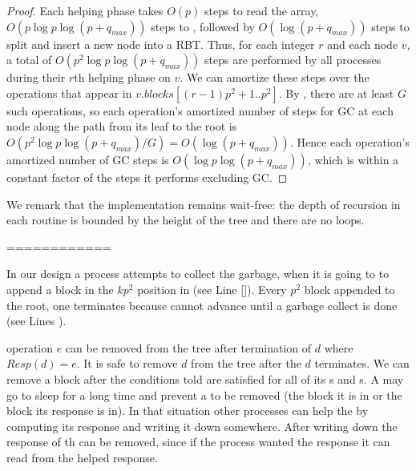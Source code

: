 \begin{proof}
Each helping phase takes $O(p)$ steps to read the  array,
$O(p \log p \log(p+q_{max}))$ steps to ,
followed by $O(\log(p+q_{max}))$ steps to split and insert a new node into a RBT.
Thus, for each integer $r$ and each node $v$, a total of $O(p^2\log p\log(p+q_{max}))$ steps
are performed by all processes during their $r$th helping phase on $v$.
We can amortize these steps over the operations that appear in 
$v.blocks[(r-1)p^2+1..p^2]$.
By , there are at least $G$ such operations, 
so each operation's amortized number of steps for GC at each node along the path from its leaf to the root
is $O(p^2\log p\log(p+q_{max})/G)=O(\log(p+q_{max}))$.
Hence each operation's amortized number of GC steps is $O(\log p\log(p+q_{max}))$, which is
within a constant factor of the steps it performs excluding GC.
\end{proof}

We remark that the implementation remains wait-free:  the depth of recursion in each routine is  bounded
by the height of the tree and there are no loops.

============

In our design a process attempts to collect the garbage, when it is going to to append a block in the $kp^2$ position in  (see Line \ref{}). Every $p^2$  block appended to the root, one  terminates because  cannot advance until a  garbage collect is done (see Lines ).

%

 operation $e$ can be removed from the tree after termination of  $d$ where $Resp(d)=e$. It is safe to remove  $d$ from the tree after the $d$ terminates. We can remove a block after the conditions told are satisfied for all of its s and s. A  may go to sleep for a long time and prevent a  to be removed (the block it is in or the block its response is in). In that situation other processes can help the  by computing its response and writing it down somewhere. After writing down the response of th  can be removed, since if the process wanted the response it can read from the helped response.

